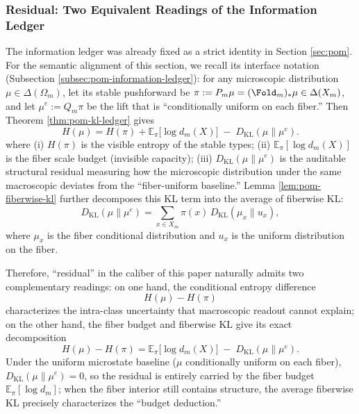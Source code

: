 \subsubsection{Residual: Two Equivalent Readings of the Information Ledger}\label{subsubsec:frt-residual-ledger}
The information ledger was already fixed as a strict identity in Section \ref{sec:pom}. For the semantic alignment of this section, we recall its interface notation (Subsection \ref{subsec:pom-information-ledger}): for any microscopic distribution \(\mu\in\Delta(\Omega_m)\), let its stable pushforward be \(\pi:=P_m\mu=(\Fold_m)_*\mu\in\Delta(X_m)\), and let \(\mu^e:=Q_m\pi\) be the lift that is ``conditionally uniform on each fiber.'' Then Theorem \ref{thm:pom-kl-ledger} gives
\[
\boxed{\;
H(\mu)=H(\pi)+\mathbb{E}_{\pi}\!\bigl[\log d_m(X)\bigr]\;-\;D_{\mathrm{KL}}(\mu\|\mu^e).
\;}
\]
where (i) \(H(\pi)\) is the visible entropy of the stable types; (ii) \(\mathbb{E}_{\pi}[\log d_m(X)]\) is the fiber scale budget (invisible capacity); (iii) \(D_{\mathrm{KL}}(\mu\|\mu^e)\) is the auditable structural residual measuring how the microscopic distribution under the same macroscopic deviates from the ``fiber-uniform baseline.'' Lemma \ref{lem:pom-fiberwise-kl} further decomposes this KL term into the average of fiberwise KL:
\[
D_{\mathrm{KL}}(\mu\|\mu^e)=\sum_{x\in X_m}\pi(x)\,D_{\mathrm{KL}}(\mu_x\|u_x),
\]
where \(\mu_x\) is the fiber conditional distribution and \(u_x\) is the uniform distribution on the fiber.\par
Therefore, ``residual'' in the caliber of this paper naturally admits two complementary readings: on one hand, the conditional entropy difference
\[
H(\mu)-H(\pi)
\]
characterizes the intra-class uncertainty that macroscopic readout cannot explain; on the other hand, the fiber budget and fiberwise KL give its exact decomposition
\[
\boxed{\;
H(\mu)-H(\pi)=\mathbb{E}_{\pi}\!\bigl[\log d_m(X)\bigr]\;-\;D_{\mathrm{KL}}(\mu\|\mu^e).
\;}
\]
Under the uniform microstate baseline (\(\mu\) conditionally uniform on each fiber), \(D_{\mathrm{KL}}(\mu\|\mu^e)=0\), so the residual is entirely carried by the fiber budget \(\mathbb{E}_{\pi}[\log d_m]\); when the fiber interior still contains structure, the average fiberwise KL precisely characterizes the ``budget deduction.''

